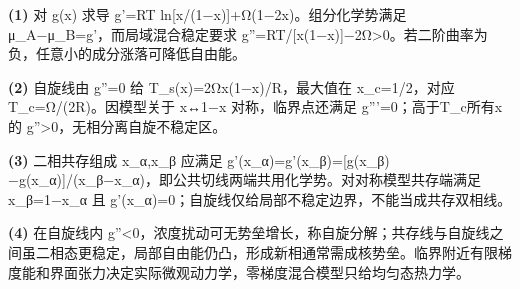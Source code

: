 \par\noindent\textbf{(1)} 对 g(x) 求导 g'=RT ln[x/(1−x)]+Ω(1−2x)。组分化学势满足 μ\_A−μ\_B=g'，而局域混合稳定要求 g''=RT/[x(1−x)]−2Ω>0。若二阶曲率为负，任意小的成分涨落可降低自由能。
\par\noindent\textbf{(2)} 自旋线由 g''=0 给 T\_s(x)=2Ωx(1−x)/R，最大值在 x\_c=1/2，对应 T\_c=Ω/(2R)。因模型关于 x↔1−x 对称，临界点还满足 g'''=0；高于T\_c所有x的 g''>0，无相分离自旋不稳定区。
\par\noindent\textbf{(3)} 二相共存组成 x\_α,x\_β 应满足 g'(x\_α)=g'(x\_β)=[g(x\_β)−g(x\_α)]/(x\_β−x\_α)，即公共切线两端共用化学势。对对称模型共存端满足 x\_β=1−x\_α 且 g'(x\_α)=0；自旋线仅给局部不稳定边界，不能当成共存双相线。
\par\noindent\textbf{(4)} 在自旋线内 g''<0，浓度扰动可无势垒增长，称自旋分解；共存线与自旋线之间虽二相态更稳定，局部自由能仍凸，形成新相通常需成核势垒。临界附近有限梯度能和界面张力决定实际微观动力学，零梯度混合模型只给均匀态热力学。
